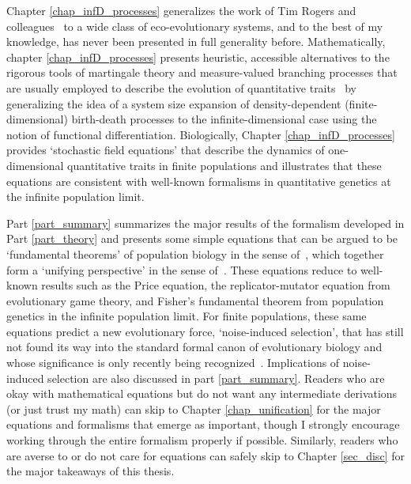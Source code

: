 Chapter \ref{chap_infD_processes} generalizes the work of Tim Rogers and colleagues~\citep{rogers_demographic_2012,rogers_spontaneous_2012,rogers_modes_2015} to a wide class of eco-evolutionary systems, and to the best of my knowledge, has never been presented in full generality before. Mathematically, chapter \ref{chap_infD_processes} presents heuristic, accessible alternatives to the rigorous tools of martingale theory and measure-valued branching processes that are usually employed to describe the evolution of quantitative traits~\citep{champagnat_unifying_2006,etheridge_mathematical_2011, week_white_2021} by generalizing the idea of a system size expansion of density-dependent (finite-dimensional) birth-death processes to the infinite-dimensional case using the notion of functional differentiation. Biologically, Chapter \ref{chap_infD_processes} provides `stochastic field equations' that describe the dynamics of one-dimensional quantitative traits in finite populations and illustrates that these equations are consistent with well-known formalisms in quantitative genetics at the infinite population limit.

Part \ref{part_summary} summarizes the major results of the formalism developed in Part \ref{part_theory} and presents some simple equations that can be argued to be `fundamental theorems' of population biology in the sense of~\cite{queller_fundamental_2017}, which together form a `unifying perspective' in the sense of~\cite{lion_theoretical_2018}. These equations reduce to well-known results such as the Price equation, the replicator-mutator equation from evolutionary game theory, and Fisher's fundamental theorem from population genetics in the infinite population limit. For finite populations, these same equations predict a new evolutionary force, `noise-induced selection', that has still not found its way into the standard formal canon of evolutionary biology and whose significance is only recently being recognized~\citep{constable_demographic_2016,mcleod_social_2019,mazzolini_universality_2022, kuosmanen_turnover_2022}. Implications of noise-induced selection are also discussed in part \ref{part_summary}. Readers who are okay with mathematical equations but do not want any intermediate derivations (or just trust my math) can skip to Chapter \ref{chap_unification} for the major equations and formalisms that emerge as important, though I strongly encourage working through the entire formalism properly if possible. Similarly, readers who are averse to or do not care for equations can safely skip to Chapter \ref{sec_disc} for the major takeaways of this thesis.

